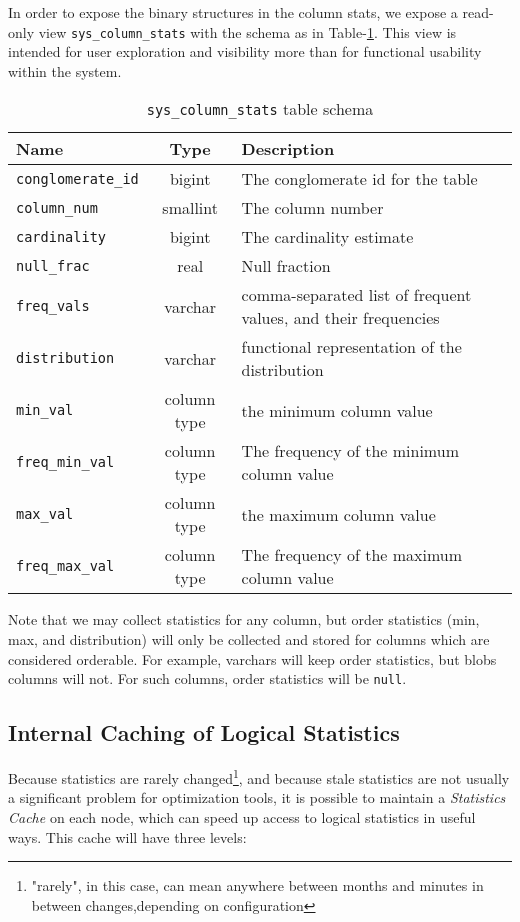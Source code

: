 In order to expose the binary structures in the column stats, we expose a read-only view \linebreak\texttt{sys\_column\_stats} with the schema as in Table-\ref{table:columnStats}. This view is intended for user exploration and visibility more than for functional usability within the system.

\begin{table}
				\begin{tabular}{|l|c|p{6cm}|}
								\hline
								\bf{Name}									& \bf{Type}	&	\bf{Description} \\ \hline	
								\texttt{conglomerate\_id}	&	bigint		&	The conglomerate id for the table \\ \hline
								\texttt{column\_num}			&	smallint	&	The column number \\ \hline
								\texttt{cardinality}			&	bigint		&	The cardinality estimate \\ \hline
								\texttt{null\_frac}				&	real			& Null fraction \\ \hline
								\texttt{freq\_vals}				&	varchar		&	comma-separated list of frequent values, and their frequencies \\ \hline	
								\texttt{distribution}			&	varchar		&	functional representation of the distribution \\ \hline
								\texttt{min\_val}					&	column type	&	the minimum column value	\\	\hline
								\texttt{freq\_min\_val}		&	column type	&	The frequency of the minimum column value \\ \hline
								\texttt{max\_val}					&	column type	&	the maximum column value	\\	\hline
								\texttt{freq\_max\_val}		&	column type	&	The frequency of the maximum column value \\ \hline
				\end{tabular}
				\caption{\texttt{sys\_column\_stats} table schema}
				\label{table:columnStats}
\end{table}

Note that we may collect statistics for any column, but order statistics (min, max, and distribution) will only be collected and stored for columns which are considered orderable. For example, varchars will keep order statistics, but blobs columns will not. For such columns, order statistics will be \texttt{null}.

\subsection{Internal Caching of Logical Statistics}
Because statistics are rarely changed\footnote{"rarely", in this case, can mean anywhere between months and minutes in between changes,depending on configuration}, and because stale statistics are not usually a significant problem for optimization tools, it is possible to maintain a \emph{Statistics Cache} on each node, which can speed up access to logical statistics in useful ways. This cache will have three levels:

